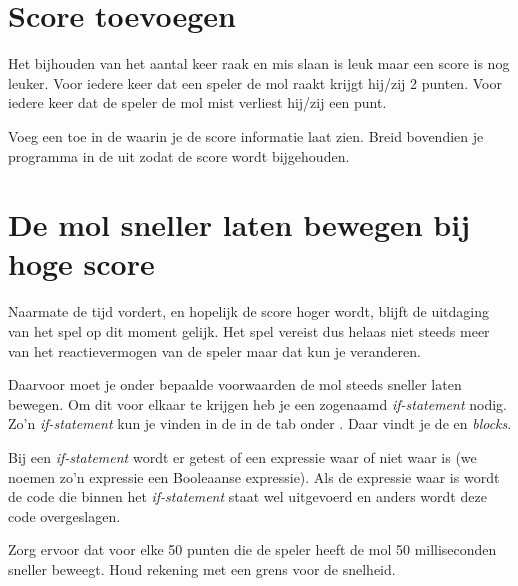 \section{Score toevoegen}
Het bijhouden van het aantal keer raak en mis slaan is leuk maar een score is nog leuker. Voor iedere keer dat een speler de mol raakt krijgt hij/zij 2 punten. Voor iedere keer dat de speler de mol mist verliest hij/zij een punt. 

\begin{opgave}
    \opgVraag
	Voeg een  toe in de  waarin je de score informatie laat zien. Breid bovendien je programma in de  uit zodat de score wordt bijgehouden. 
\end{opgave}


\section{De mol sneller laten bewegen bij hoge score}
Naarmate de tijd vordert, en hopelijk de score hoger wordt, blijft de uitdaging van het spel op dit moment gelijk. Het spel vereist dus helaas niet steeds meer van het reactievermogen van de speler maar dat kun je veranderen.

Daarvoor moet je onder bepaalde voorwaarden de mol steeds sneller laten bewegen. Om dit voor elkaar te krijgen heb je een zogenaamd \emph{if-statement} nodig. Zo'n \emph{if-statement} kun je vinden in de  in de tab  onder . Daar vindt je de  en  \emph{blocks}.

Bij een \emph{if-statement} wordt er getest of een expressie waar of niet waar is (we noemen zo'n expressie een Booleaanse expressie). Als de expressie waar is wordt de code die binnen het \emph{if-statement} staat wel uitgevoerd en anders wordt deze code overgeslagen.

\begin{opgave}
    \opgVraag
	Zorg ervoor dat voor elke 50 punten die de speler heeft de mol 50 milliseconden sneller beweegt. Houd rekening met een grens voor de snelheid.
\end{opgave}


